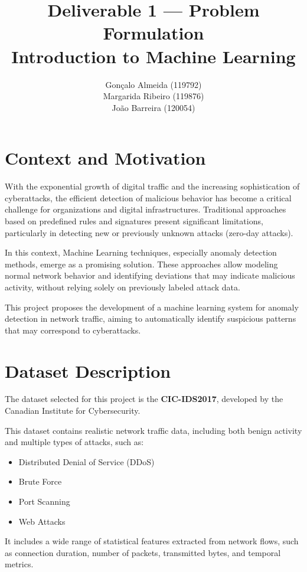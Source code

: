 \documentclass[11pt]{article}
\title{\textbf{Deliverable 1 — Problem Formulation}\\
Introduction to Machine Learning}
\author{
Gonçalo Almeida (119792) \\
Margarida Ribeiro (119876) \\
João Barreira (120054)
}
\date{}
\begin{document}
\maketitle

\onehalfspacing

\section{Context and Motivation}

With the exponential growth of digital traffic and the increasing sophistication of cyberattacks, the efficient detection of malicious behavior has become a critical challenge for organizations and digital infrastructures. Traditional approaches based on predefined rules and signatures present significant limitations, particularly in detecting new or previously unknown attacks (zero-day attacks).

In this context, Machine Learning techniques, especially anomaly detection methods, emerge as a promising solution. These approaches allow modeling normal network behavior and identifying deviations that may indicate malicious activity, without relying solely on previously labeled attack data.

This project proposes the development of a machine learning system for anomaly detection in network traffic, aiming to automatically identify suspicious patterns that may correspond to cyberattacks.

\section{Dataset Description}

The dataset selected for this project is the \textbf{CIC-IDS2017}, developed by the Canadian Institute for Cybersecurity.

This dataset contains realistic network traffic data, including both benign activity and multiple types of attacks, such as:
\begin{itemize}
    \item Distributed Denial of Service (DDoS)
    \item Brute Force
    \item Port Scanning
    \item Web Attacks
\end{itemize}

It includes a wide range of statistical features extracted from network flows, such as connection duration, number of packets, transmitted bytes, and temporal metrics.
\end{document}
